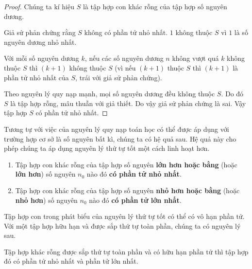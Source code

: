 \begin{proof}
    Chúng ta kí hiệu $S$ là tập hợp con khác rỗng của tập hợp số nguyên dương.

    Giả sử phản chứng rằng $S$ không có phần tử nhỏ nhất. $1$ không thuộc $S$ vì $1$ là số nguyên dương nhỏ nhất.

    Với mỗi số nguyên dương $k$, nếu các số nguyên dương $n$ không vượt quá $k$ không thuộc $S$ thì $(k+1)$ không thuộc $S$ (vì nếu $(k+1)$ thuộc $S$ thì $(k+1)$ là phần tử nhỏ nhất của $S$, trái với giả sử phản chứng).

    Theo nguyên lý quy nạp mạnh, mọi số nguyên dương đều không thuộc $S$. Do đó $S$ là tập hợp rỗng, mâu thuẫn với giả thiết. Do vậy giả sử phản chứng là sai. Vậy tập hợp $S$ có phần tử nhỏ nhất.
\end{proof}

Tương tự với việc của nguyên lý quy nạp toán học có thể được áp dụng với trường hợp cơ sở là số nguyên bất kì, chúng ta có hệ quả sau. Hệ quả này cho phép chúng ta áp dụng nguyên lý thứ tự tốt một cách linh hoạt hơn.
\begin{corollary}
    \begin{enumerate}[label={(\roman*)}]
        \item Tập hợp con khác rỗng của tập hợp số nguyên \textbf{lớn hơn hoặc bằng} (hoặc \textbf{lớn hơn}) số nguyên $n_{0}$ nào đó \textbf{có phần tử nhỏ nhất}.
        \item Tập hợp con khác rỗng của tập hợp số nguyên \textbf{nhỏ hơn hoặc bằng} (hoặc \textbf{nhỏ hơn}) số nguyên $n_{0}$ nào đó \textbf{có phần tử lớn nhất}.
    \end{enumerate}
\end{corollary}

Tập hợp con trong phát biểu của nguyên lý thứ tự tốt có thể có vô hạn phần tử. Với một tập hợp hữu hạn và được sắp thứ tự toàn phần, chúng ta có nguyên lý sau.
\begin{theorem}
    Tập hợp khác rỗng được sắp thứ tự toàn phần và có hữu hạn phần tử thì tập hợp đó có phần tử nhỏ nhất và phần tử lớn nhất.
\end{theorem}

